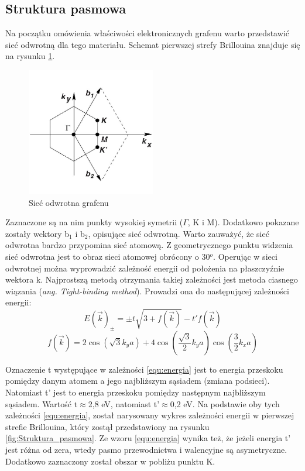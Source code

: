 	\subsection{Struktura pasmowa}
	Na początku omówienia właściwości elektronicznych grafenu warto przedstawić sieć odwrotną dla tego materiału.
	Schemat pierwszej strefy Brillouina znajduje się na rysunku \ref{fig:siec_odwrotna}.
	
	\vspace{-10pt}
	\begin{figure}[ht]
	\centering
	\includegraphics[width=0.50\textwidth]{./Rozdzial_2/obrazki/Siec_odwrotna.jpg}
	\caption{Sieć odwrotna grafenu}
	\label{fig:siec_odwrotna}
	\end{figure}
	\vspace{-10pt}
	Zaznaczone są na nim punkty wysokiej symetrii ($\Gamma$, K i M). Dodatkowo pokazane zostały wektory b$_1$ i b$_2$, 
	opisujące sieć odwrotną. Warto zauważyć, że sieć odwrotna bardzo przypomina sieć atomową. Z geometrycznego punktu
	widzenia sieć odwrotna jest to obraz sieci atomowej obrócony o 30$^o$. 
	Operując w sieci odwrotnej można wyprowadzić zależność energii od położenia na płaszczyźnie wektora k. Najprostszą
	metodą otrzymania takiej zależności jest metoda ciasnego wiązania (\textit{ang. Tight-binding method}). Prowadzi ona
	do następującej zależności energii:
	\begin{equation}
    		E(\vec k)_{\pm}=\pm t \sqrt{3+f(\vec k)} - t'f(\vec k)
		\label{equ:energia}
	\end{equation}
	\begin{equation}
    		f(\vec k)= 2\cos({\sqrt{3}k_y a}) + 4\cos \left (\frac{\sqrt{3}}{2} k_y a \right )\cos \left (\frac{3}{2}k_xa \right )
	\end{equation}

	Oznaczenie t występujące w zależności \ref{equ:energia} jest to energia przeskoku pomiędzy danym atomem a 
	jego najbliższym sąsiadem (zmiana podsieci). Natomiast t' jest to energia przeskoku pomiędzy następnym najbliższym
	sąsiadem. Wartość t$\approx$2,8 eV, natomiast t'$\approx$0,2 eV. Na podstawie oby tych zależności 
	\ref	{equ:energia}, został narysowany wykres zależności energii w pierwszej strefie Brillouina, który zostął 
	przedstawiony na rysunku \ref{fig:Struktura_pasmowa}.
	Ze wzoru \ref{equ:energia} wynika też, że jeżeli energia t' jest różna od zera, wtedy pasmo przewodnictwa i 
	walencyjne są asymetryczne.
	Dodatkowo zaznaczony został obszar w pobliżu punktu K.
	
